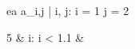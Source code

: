 \begin{eqcode}{e}{a }{}{}
  a_{i,j} | i, j: i = 1 \cap j = 2 \gets
  \begin{cases}
    5 & i: i < 1.1  & \otherwise \lend
  \end{cases} \lend
\end{eqcode}
